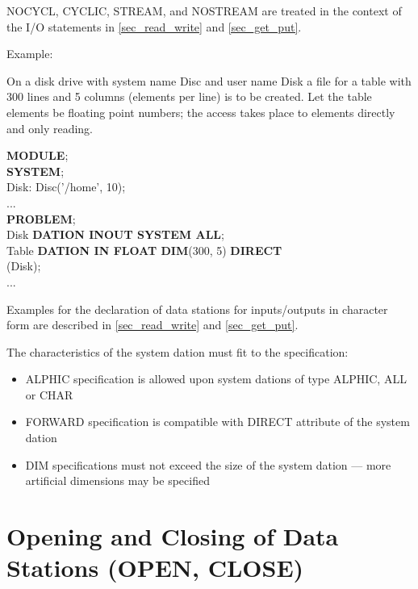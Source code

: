 
NOCYCL, CYCLIC, STREAM, and NOSTREAM are treated in the context of the
I/O statements in 
\ref{sec_read_write} and \ref{sec_get_put}.

Example:

On a disk drive with system name 
Disc
 and user name Disk a file for a
table with 300 lines and 5 columns (elements per line) is to be created.
Let the table elements be floating point numbers; the access takes place
to elements directly and only reading.

{\bf MODULE};\\

{\bf SYSTEM};\\
\x Disk: Disc('/home', 10);\\
\x ... \\
\label{Example}
{\bf PROBLEM};\\
 Disk {\bf DATION INOUT SYSTEM ALL};\\
 Table {\bf DATION IN FLOAT DIM}(300, 5) {\bf DIRECT}\\
\x {} (Disk);\\
\x ...

Examples for the declaration of data stations for inputs/outputs in
character form are described in 
\ref{sec_read_write} and \ref{sec_get_put}.

The characteristics of the system dation must fit to the specification:
\begin{itemize}
\item ALPHIC specification is allowed upon system dations of type ALPHIC,
   ALL or CHAR
\item FORWARD specification is compatible with DIRECT attribute
   of the system dation
\item DIM specifications must not exceed the size of the system dation ---
      more artificial dimensions may be specified
\end{itemize}

\section{Opening and Closing of Data Stations (OPEN, CLOSE)}   %
\label{sec_open_close}

